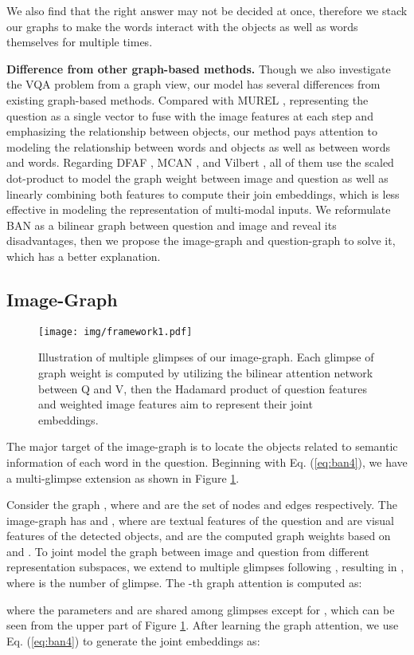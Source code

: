 \documentclass[10pt,twocolumn,letterpaper]{article}
\begin{document}
We also find that the right answer may not be decided at once, therefore we stack our graphs to make the words interact with the objects as well as words themselves for multiple times.

\textbf{Difference from other graph-based methods.} Though we also investigate the VQA problem from a graph view, our model has several differences from existing graph-based methods. Compared with MUREL \cite{cadene2019murel}, representing the question as a single vector to fuse with the image features at each step and emphasizing the relationship between objects, our method pays attention to modeling the relationship between words and objects as well as between words and words. Regarding DFAF \cite{gao2019dynamic}, MCAN \cite{yu2019deep}, and Vilbert \cite{lu2019vilbert}, all of them use the scaled dot-product \cite{vaswani2017attention} to model the graph weight between image and question as well as linearly combining both features to compute their join embeddings, which is less effective in modeling the representation of multi-modal inputs. We reformulate BAN as a bilinear graph between question and image and reveal its disadvantages, then we propose the image-graph and question-graph to solve it, which has a better explanation.

\subsection{Image-Graph}
\begin{figure}
	\centering
	\texttt{[image: img/framework1.pdf]}
	\caption{Illustration of multiple glimpses of our image-graph. Each glimpse of graph weight  is computed by utilizing the bilinear attention network between Q and V, then the Hadamard product of question features and weighted image features aim to represent their joint embeddings.}
	\label{fig:framework1}
\vspace{-5pt}
\end{figure}
The major target of the image-graph is to locate the objects related to semantic information of each word in the question. Beginning with Eq. (\ref{eq:ban4}), we have a multi-glimpse extension as shown in Figure \ref{fig:framework1}. 

Consider the graph , where  and  are the set of nodes and edges respectively. The image-graph has  and , where  are textual features of the question and  are visual features of the detected objects, and  are the computed graph weights based on  and . To joint model the graph between image and question from different representation subspaces, we extend  to multiple glimpses following \cite{kim2018bilinear, vaswani2017attention}, resulting in , where  is the number of glimpse. The -th graph attention is computed as:
\vspace{-5pt}
{\small

}
where the parameters  and  are shared among glimpses except for , which can be seen from the upper part of Figure \ref{fig:framework1}. After learning the graph attention, we use Eq. (\ref{eq:ban4}) to generate the joint embeddings as:
\vspace{-5pt}
\end{document}
